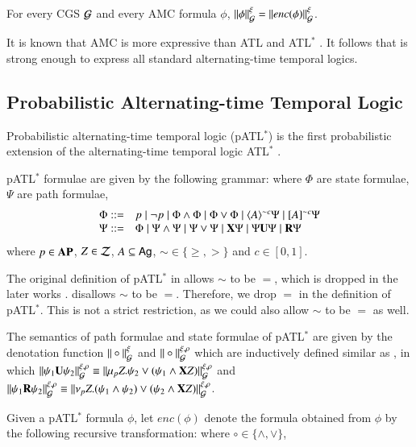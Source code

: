 \begin{theorem}
For every CGS $\mathcal{G}$ and every AMC formula $\phi$, $\|{\phi}\|_{\mathcal{G}}^\xi=\|{enc(\phi)}\|_{\mathcal{G}}^\xi$.
\end{theorem}

It is known that AMC is more expressive than ATL and ATL$^*$ \cite{AHK02}.
It follows that \pamcs is strong enough to express all standard alternating-time temporal logics.


\subsection{Probabilistic Alternating-time Temporal Logic}
Probabilistic alternating-time temporal logic (pATL$^*$) is the first probabilistic extension of the alternating-time temporal logic ATL$^*$ \cite{CL07a,Sch10,HSZ12}.

\begin{definition}pATL$^*$ formulae are given by the following grammar: where $\Phi$ are state formulae, $\Psi$ are path formulae,
$$\begin{array}{cl}
  \Phi::= & p \mid \neg p  \mid \Phi\wedge \Phi \mid \Phi\vee \Phi \mid \langle{A}\rangle^{\sim c}\Psi \mid  [{A}]^{\sim c}\Psi \\
  \Psi::= & \Phi\mid \Psi\wedge \Psi \mid \Psi\vee \Psi \mid  {\bf X} \Psi \mid \Psi {\bf U} \Psi   \mid {\bf R}\Psi
\end{array}$$
where $p\in {\bf AP}$, $Z\in \mathcal{Z}$, $A\subseteq  \textsf{Ag}$, $\sim\in\{\geq, >\}$ and $c\in[0,1]$.
\end{definition}

\begin{remark}
The original definition of pATL$^*$ in \cite{CL07a} allows $\sim$ to be $=$, which is dropped in the later works \cite{Sch10,HSZ12}.
\pamc  disallows $\sim$ to be $=$. Therefore, we drop $=$ in the definition of pATL$^*$. This is not a strict restriction, as we could also allow $\sim$ to be $=$ as well.
\end{remark}

The semantics of path formulae and state formulae of pATL$^*$ are given by the denotation function $\|\circ\|_{\mathcal{G}}^\xi$ and $\|\circ\|_{\mathcal{G}}^{\xi,\rho}$ which are inductively defined similar as \pamc,
in which
$\|\psi_1{\bf U}\psi_2\|_{\mathcal{G}}^{\xi,\rho}\equiv \|\mu_p Z.\psi_2\vee (\psi_1\wedge {\bf X} Z)\|_{\mathcal{G}}^{\xi,\rho}$ and
$\|\psi_1{\bf R}\psi_2\|_{\mathcal{G}}^{\xi,\rho}\equiv \|\nu_p Z.(\psi_1\wedge \psi_2)\vee (\psi_2\wedge {\bf X} Z)\|_{\mathcal{G}}^{\xi,\rho}$.


Given a pATL$^*$ formula $\phi$, let $enc(\phi)$ denote the formula obtained from $\phi$ by the following recursive transformation:
where $\circ\in\{\wedge,\vee\}$,

